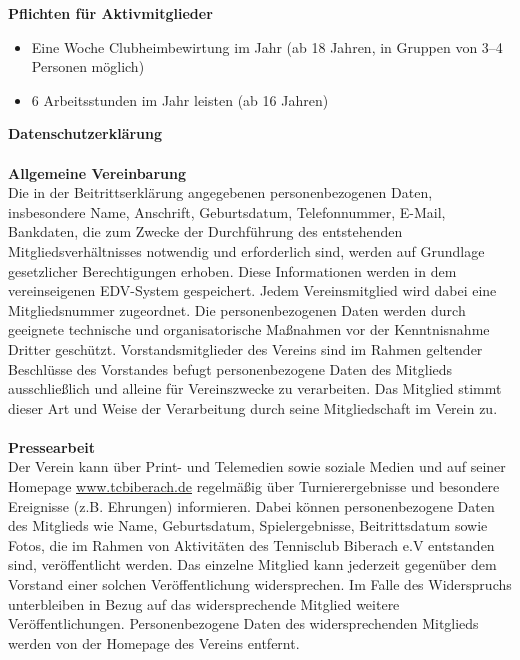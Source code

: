 \begin{Form}
	{
		\huge
		\centering
		\textbf{Pflichten für Aktivmitglieder}\\
	}
	\noindent
	\begin{itemize}
		\item Eine Woche Clubheimbewirtung im Jahr (ab 18 Jahren, in Gruppen von 3--4 Personen möglich)
		\item 6 Arbeitsstunden im Jahr leisten (ab 16 Jahren)
	\end{itemize}
	{
		\huge
		\centering
		\textbf{Datenschutzerklärung}\\\ \\
	}
	\noindent
	\textbf{\Large Allgemeine Vereinbarung}\\
	Die in der Beitrittserklärung angegebenen personenbezogenen Daten, insbesondere Name, Anschrift, Geburtsdatum, Telefonnummer, E-Mail, Bankdaten, die zum Zwecke der Durchführung des entstehenden Mitgliedsverhältnisses notwendig und erforderlich sind, werden auf Grundlage gesetzlicher Berechtigungen erhoben. Diese Informationen werden in dem vereinseigenen EDV-System gespeichert. Jedem Vereinsmitglied wird dabei eine Mitgliedsnummer zugeordnet. Die personenbezogenen Daten werden durch geeignete technische und organisatorische Maßnahmen vor der Kenntnisnahme Dritter geschützt. Vorstandsmitglieder des Vereins sind im Rahmen geltender Beschlüsse des Vorstandes befugt personenbezogene Daten des Mitglieds ausschließlich und alleine für Vereinszwecke zu verarbeiten. Das Mitglied stimmt dieser Art und Weise der Verarbeitung durch seine Mitgliedschaft im Verein zu.\\\\
	\noindent
	\textbf{\Large Pressearbeit}\\
	Der Verein kann über Print- und Telemedien sowie soziale Medien und auf seiner Homepage \url{www.tcbiberach.de} regelmäßig über Turnierergebnisse und besondere Ereignisse (z.B. Ehrungen) informieren.	Dabei können personenbezogene Daten des Mitglieds wie Name, Geburtsdatum, Spielergebnisse, Beitrittsdatum sowie Fotos, die im Rahmen von Aktivitäten des Tennisclub Biberach e.V entstanden sind, veröffentlicht werden. Das einzelne Mitglied kann jederzeit gegenüber dem Vorstand einer solchen Veröffentlichung widersprechen. Im Falle des Widerspruchs unterbleiben in Bezug auf das widersprechende Mitglied weitere Veröffentlichungen. Personenbezogene Daten des widersprechenden Mitglieds werden von der Homepage des Vereins entfernt.\\\\

\end{Form}
